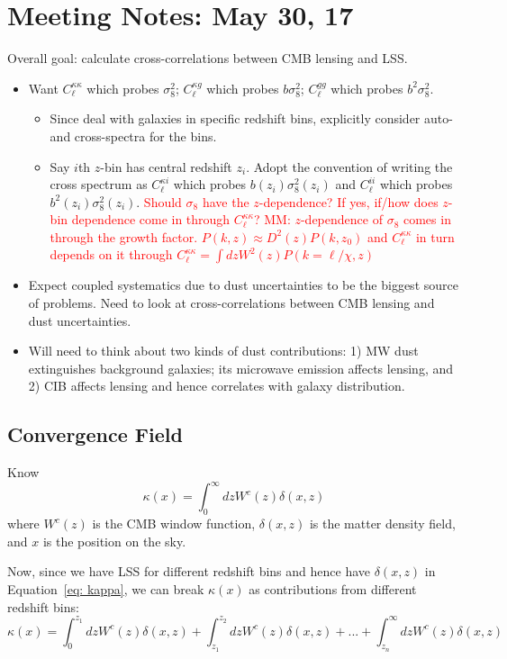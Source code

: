 \documentclass{article}
\newcommand{\eq}[1]{\begin{equation}{#1}\end{equation}}
\newcommand{\clred}[1]{\textcolor{red}{#1}}
\begin{document}
\large{
\section*{Meeting Notes: May 30, 17}
Overall goal: calculate cross-correlations between CMB lensing and LSS.
\begin{itemize}\item Want $C_\ell^{\kappa\kappa}$ which probes $\sigma_8^2$; $C_\ell^{\kappa g}$ which probes $b\sigma_8^2$; $C_\ell^{gg}$ which probes $b^2\sigma_8^2$.
	\begin{itemize}
	\item Since deal with galaxies in specific redshift bins, explicitly consider auto- and cross-spectra for the bins.
	\item Say $i$th $z$-bin has central redshift $z_i$. Adopt the convention of writing the cross spectrum as $C_\ell^{\kappa i}$ which probes $b(z_i) \sigma_8^2(z_i)$ and $C_\ell^{ii}$ which probes $b^2(z_i)\sigma_8^2(z_i)$. \clred{Should $\sigma_8$ have the $z$-dependence? If yes, if/how does $z$-bin dependence come in through $C_\ell^{\kappa\kappa}$?}
          \clred{MM: $z$-dependence of $\sigma_8$ comes in through the growth factor. $P(k,z)\approx D^2(z)P(k,z_0)$ and $C_\ell^{\kappa\kappa}$ in turn depends on it through $C_\ell^{\kappa\kappa}=\int dz W^2(z) P(k=\ell/\chi,z)$}
	\end{itemize}
\item Expect coupled systematics due to dust uncertainties to be the biggest source of problems. Need to look at cross-correlations between CMB lensing and dust uncertainties.
\item Will need to think about two kinds of dust contributions: 1) MW dust extinguishes background galaxies; its microwave emission affects lensing, and 2) CIB affects lensing and hence correlates with galaxy distribution.
\end{itemize}

\subsection*{Convergence Field}
Know
\eq{\kappa(x)= \int_0^\infty dz W^c(z)\delta(x,z) \label{eq: kappa}}
where $W^c(z)$ is the CMB window function, $\delta(x,z)$ is the matter density field, and $x$ is the position on the sky.

Now, since we have LSS for different redshift bins and hence have $\delta(x, z)$ in Equation~\ref{eq: kappa}, we can break $\kappa(x)$ as contributions from different redshift bins:
\eq{\kappa(x)= \int_0^{z_1} dz W^c(z)\delta(x,z) + \int_{z_1}^{z_2} dz W^c(z)\delta(x,z) + ... + \int_{z_n}^\infty dz W^c(z)\delta(x,z) \label{eq: kappa break}}

}
\end{document}
